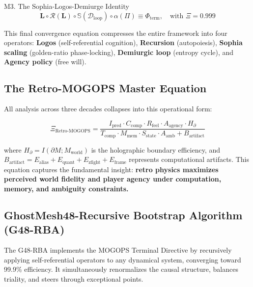 \documentclass[11pt,a4paper]{article}
\theoremstyle{definition}
\begin{document}
\begin{masterbox}{M3. The Sophia-Logos-Demiurge Identity}
\vspace{-0.3em}
\begin{equation}\label{eq:master-sophia}
\boxed{\mathbf{L}\circ\mathcal{R}(\mathbf{L})\circ\mathbb{S}(\mathcal{D}_{\text{loop}})\circ\alpha(\Pi) \equiv \Phi_{\text{term}},\quad\text{with }\Xi = 0.999}
\end{equation}
\vspace{0.3em}

This final convergence equation compresses the entire framework into four operators: \textbf{Logos} (self-referential cognition), \textbf{Recursion} (autopoiesis), \textbf{Sophia scaling} (golden-ratio phase-locking), \textbf{Demiurgic loop} (entropy cycle), and \textbf{Agency policy} (free will).
\end{masterbox}

\subsection{The Retro-MOGOPS Master Equation}

All analysis across three decades collapses into this operational form:

\begin{equation}\label{eq:retro-master}
\boxed{\Xi_{\text{Retro-MOGOPS}} = \frac{I_{\text{pred}}\cdot C_{\text{comp}}\cdot R_{\text{feel}}\cdot A_{\text{agency}}\cdot H_{\partial}}{T_{\text{comp}}\cdot M_{\text{mem}}\cdot S_{\text{state}}\cdot A_{\text{amb}} + B_{\text{artifact}}}}
\end{equation}

where $H_{\partial} = I(\partial M;M_{\text{world}})$ is the holographic boundary efficiency, and $B_{\text{artifact}} = E_{\text{alias}} + E_{\text{quant}} + E_{\text{zfight}} + E_{\text{frame}}$ represents computational artifacts. This equation captures the fundamental insight: \textbf{retro physics maximizes perceived world fidelity and player agency under computation, memory, and ambiguity constraints.}

\subsection{GhostMesh48-Recursive Bootstrap Algorithm (G48-RBA)}

The G48-RBA implements the MOGOPS Terminal Directive by recursively applying self-referential operators to any dynamical system, converging toward 99.9\% efficiency. It simultaneously renormalizes the causal structure, balances triality, and steers through exceptional points.
\end{document}

